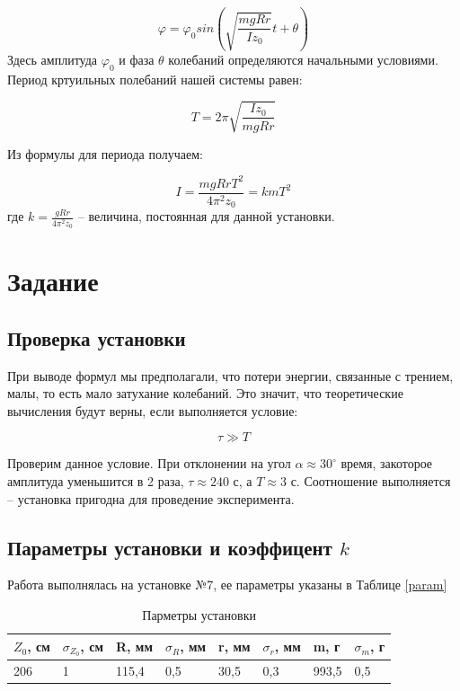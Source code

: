 \documentclass[a4paper,14pt]{extarticle}
\begin{document}
	\begin{equation}
		\varphi = \varphi_0 sin \left(\sqrt{\frac{mgRr}{Iz_0}}t + \theta\right)
	\end{equation}
	Здесь амплитуда $\varphi_0$ и фаза $\theta$ колебаний определяются начальными условиями. Период кртуильных полебаний нашей системы равен:
	
	\begin{equation}
		T = 2\pi \sqrt{\frac{Iz_0}{mgRr}}
	\end{equation}
	
	Из формулы для периода получаем:
	
	\begin{equation}\label{momin}
		I = \frac{mgRrT^2}{4 \pi^2z_0} = kmT^2
	\end{equation}
	\noindent где $k = \frac{gRr}{4\pi^2z_0}$ -- величина, постоянная для данной установки.
	
	\section{Задание}
	\subsection{Проверка установки}
	
	При выводе формул мы предполагали, что потери энергии, связанные с трением, малы, то есть мало затухание колебаний. Это значит, что теоретические вычисления будут верны, если выполняется условие:
	
	\begin{equation}
		\tau \gg T
	\end{equation}
	
	Проверим данное условие. При отклонении на угол $\alpha \approx 30^\circ$ время, закоторое амплитуда уменьшится в 2 раза, $\tau \approx 240\text{ с}$, а $T \approx 3\text{ с}$. Соотношение выполняется -- установка пригодна для проведение эксперимента.
	
	\subsection{Параметры установки и коэффицент $k$}
	
	Работа выполнялась на установке №7, ее параметры указаны в Таблице \eqref{param}
	\begin{table}[!ht]
		\begin{center}
		\begin{tabular}{|l|l|l|l|l|l|l|l|}
			\hline
			$Z_0$, см & $\sigma_{Z_0}$, см & R, мм  & $\sigma_R$, мм & r, мм & $\sigma_r$, мм  & m, г & $\sigma_m$, г  \\ \hline
			206 & 1 & 115,4 & 0,5 & 30,5 & 0,3 & 993,5 & 0,5 \\ \hline
		\end{tabular}
		\caption{Парметры установки}
		\label{param}
		\end{center}
	\end{table}
	
\end{document}
